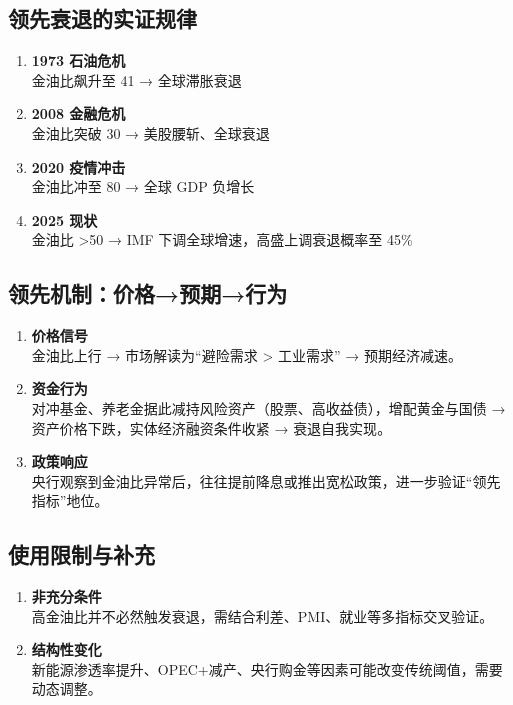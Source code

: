 \subsection{领先衰退的实证规律}
\begin{enumerate}[leftmargin=*, nosep]
    \item \textbf{1973 石油危机}  \\
    金油比飙升至 41 → 全球滞胀衰退
    \item \textbf{2008 金融危机}  \\
    金油比突破 30 → 美股腰斩、全球衰退
    \item \textbf{2020 疫情冲击}  \\
    金油比冲至 80 → 全球 GDP 负增长
    \item \textbf{2025 现状}  \\
    金油比 >50 → IMF 下调全球增速，高盛上调衰退概率至 45\%
\end{enumerate}

\subsection{领先机制：价格→预期→行为}
\begin{enumerate}[leftmargin=*, nosep]
    \item \textbf{价格信号}  \\
    {\color{red}金油比上行 → 市场解读为“避险需求 > 工业需求” → 预期经济减速。}
    \item \textbf{资金行为}  \\
    对冲基金、养老金据此减持风险资产（股票、高收益债），增配黄金与国债 → 资产价格下跌，实体经济融资条件收紧 → {\color{red}衰退自我实现}。
    \item \textbf{政策响应}  \\
    {\color{red}央行观察到金油比异常后，往往提前降息或推出宽松政策，进一步验证“领先指标”地位。}
\end{enumerate}

\subsection{使用限制与补充}
\begin{enumerate}[leftmargin=*, nosep]
    \item \textbf{非充分条件}  \\
    高金油比并不必然触发衰退，需结合利差、PMI、就业等多指标交叉验证。
    \item \textbf{结构性变化}  \\
    {\color{red}新能源渗透率提升、OPEC+减产、央行购金等因素可能改变传统阈值，需要动态调整。}
\end{enumerate}


